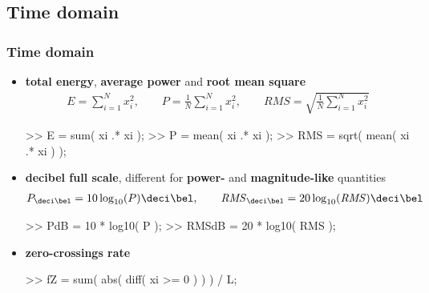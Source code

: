 
\subsection{Time domain}

\begin{frame}[fragile]
	\frametitle{Time domain}
	\begin{itemize}
		\item \textbf{total energy}, \textbf{average power} and \textbf{root mean square}
			\begin{align*}
				E=\sum_{i=1}^Nx_i^2,\qquad P=\frac1N\sum_{i=1}^Nx_i^2,\qquad\mathit{RMS}=\sqrt{\frac1N\sum_{i=1}^Nx_i^2}
			\end{align*}
			\begin{code}
>> E = sum( xi .* xi );
>> P = mean( xi .* xi );
>> RMS = sqrt( mean( xi .* xi ) );
			\end{code}
		\item \textbf{decibel full scale}, different for \textbf{power-} and \textbf{magnitude-like} quantities
			\begin{align*}
				P_{\deci\bel}=10\log_{10}(P)\deci\bel,\qquad\mathit{RMS}_{\deci\bel}=20\log_{10}(\mathit{RMS})\deci\bel
			\end{align*}
			\begin{code}
>> PdB = 10 * log10( P ); \color[medium]%
>> RMSdB = 20 * log10( RMS ); \color[medium]%
			\end{code}
		\item \textbf{zero-crossings rate}
			\begin{code}
>> fZ = sum( abs( diff( xi >= 0 ) ) ) / L;
			\end{code}
	\end{itemize}
\end{frame}

